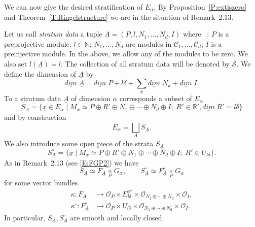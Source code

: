 \documentclass[a4paper,10pt]{amsart}
\def\N{\mathbb{N}}
\def\a{\alpha}
\def\ux{\underline{x}}
\numberwithin{equation}{section}
\begin{document}
\vspace{.1in}

We can now give the desired stratification of $E_{\a}$.  By Proposition~\ref{P:extiszero} and Theorem~\ref{T:Ringelstructure} we are in the situation of Remark~2.13.

Let us call \textit{stratum data} a tuple $\underline{A}=(P, l, N_1, \ldots, N_d, I)$ where ~: $P$ is a preprojective module; $l \in \N$; $N_1, \ldots, N_d$ are modules in $\mathcal{C}_1, \ldots, \mathcal{C}_d$; $I$ is a preinjective module. In the above, we allow any of the modules to be zero. We also set $l({\underline{A}})=l$.  The collection of all stratum data will be denoted by $\mathcal{S}$. We define the dimension of $\underline{A}$ by 
$$\underline{dim}\; \underline{A}=\underline{dim}\;P + l\delta + \sum_k \underline{dim}\;N_k + \underline{dim}\;I.$$
To a stratum data $\underline{A}$ of dimension $\a$ corresponds a subset of $E_{\a}$
$$S_{\underline{A}}=\big\{ \underline{x} \in E_{\a}\;|\;M_{\ux} \simeq P \oplus R' \oplus N_1 \oplus \cdots \oplus N_d \oplus I; \; R' \in \mathbb{R}', \underline{dim}\;R' =l\delta\big\}$$
and by construction
$$E_{\a} =\bigsqcup_{\underline{A}} S_{\underline{A}}.$$
We also introduce some open piece of the strata $S_{\underline{A}}$ 
$$S^{\circ}_{\underline{A}}=\big\{ \underline{x}\;|\;M_{\ux} \simeq P \oplus R' \oplus N_1 \oplus \cdots \oplus N_d \oplus I; \; R' \in U_{l\delta} \big\}.$$
As in Remark~2.13 (see \ref{E:FGP2}) we have
$$S_{\underline{A}} \simeq F_{\underline{A}} \underset{P}{\times} G_{\a}, \qquad S^{\circ}_{\underline{A}} \simeq F^{\circ}_{\underline{A}} \underset{P}{\times} G_{\a}$$
for some vector bundles
\begin{equation}\label{E:sasa'}
\begin{split}
\kappa:  F_{\underline{A}} &\to \mathcal{O}_P \times E_{l\delta}^{\mathbb{R}'} \times \mathcal{O}_{N_1 \oplus \cdots \oplus N_d} \times \mathcal{O}_I, \\
\kappa^{\circ}:  F^{\circ}_{\underline{A}} &\to \mathcal{O}_P \times U_{l\delta} \times \mathcal{O}_{N_1 \oplus \cdots \oplus N_d} \times \mathcal{O}_I.
\end{split}
\end{equation}
In particular, $S_{\underline{A}}, S^{\circ}_{\underline{A}}$ are smooth and locally closed.

\vspace{.1in}
\end{document}
